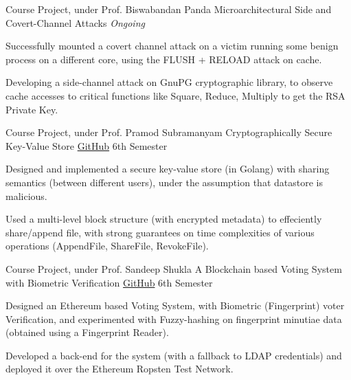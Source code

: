 \begin{cventries}


  \cventry
  {Course Project, under Prof. Biswabandan Panda}
  {Microarchitectural Side and Covert-Channel Attacks}
  {}
  {\textit{Ongoing}}
  {
    \begin{cvitems}
        \item Successfully mounted a covert channel attack on a victim running some benign process on a different core, using the FLUSH + RELOAD attack on cache.
        \item Developing a side-channel attack on GnuPG cryptographic library, to observe cache accesses to critical functions like Square, Reduce, Multiply to get the RSA Private Key.
    \end{cvitems}
  }

  \cventry
  {Course Project, under Prof. Pramod Subramanyam}
  {Cryptographically Secure Key-Value Store}
  {\href{https://github.com/mayanksha/crypt-key-value-store}{\faGithubSquare\acvHeaderIconSep GitHub}}
  {6th Semester}
  {
    \begin{cvitems}
    \item Designed and implemented a secure key-value store (in Golang) with sharing semantics (between different users), under the assumption that datastore is malicious.
    \item Used a multi-level block structure (with encrypted metadata) to effeciently share/append file, with strong guarantees on time complexities of various operations (AppendFile, ShareFile, RevokeFile).
    \end{cvitems}
  }

  \cventry
  {Course Project, under Prof. Sandeep Shukla}
  {A Blockchain based Voting System with Biometric Verification}
  {\href{https://github.com/mayanksha/blockchain/tree/master/Project}{\faGithubSquare\acvHeaderIconSep GitHub}}
  {6th Semester}
  {
    \begin{cvitems}
    \item Designed an Ethereum based Voting System, with Biometric (Fingerprint) voter Verification, and experimented with Fuzzy-hashing on fingerprint minutiae data (obtained using a Fingerprint Reader).
    \item Developed a back-end for the system (with a fallback to LDAP credentials) and deployed it over the Ethereum Ropsten Test Network.
    \end{cvitems}
  }


\end{cventries}
